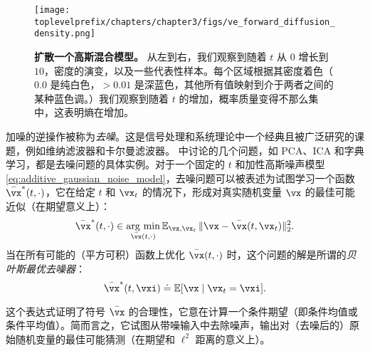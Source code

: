 \documentclass[../../book-main_zh.tex]{subfiles}
\begin{document}
\begin{figure}
	\texttt{[image: \\toplevelprefix/chapters/chapter3/figs/ve\_forward\_diffusion\_density.png]}
	\caption{\small\textbf{扩散一个高斯混合模型。} 从左到右，我们观察到随着 \(t\) 从 \(0\) 增长到 \(10\)，密度的演变，以及一些代表性样本。每个区域根据其密度着色（\(0.0\) 是纯白色，\(> 0.01\) 是深蓝色，其他所有值映射到介于两者之间的某种蓝色调。）我们观察到随着 \(t\) 的增加，概率质量变得不那么集中，这表明熵在增加。}
	\label{fig:ve_forward_density}
\end{figure}

加噪的逆操作被称为\textit{去噪}。这是信号处理和系统理论中一个经典且被广泛研究的课题，例如维纳滤波器和卡尔曼滤波器。 中讨论的几个问题，如 PCA、ICA 和字典学习，都是去噪问题的具体实例。对于一个固定的 \(t\) 和加性高斯噪声模型 \eqref{eq:additive_gaussian_noise_model}，去噪问题可以被表述为试图学习一个函数 \(\bar{\vx}^{\ast}(t, \cdot)\)，它在给定 \(t\) 和 \(\vx_{t}\) 的情况下，形成对真实随机变量 \(\vx\) 的最佳可能近似（在期望意义上）：
\begin{equation}\label{eq:denoising_loss}
	\bar{\vx}^{\ast}(t, \cdot) \in \argmin_{\bar{\vx}(t, \cdot)}\Ex_{\vx, \vx_{t}}\norm{\vx - \bar{\vx}(t, \vx_{t})}_{2}^{2}.
\end{equation}
当在所有可能的（平方可积）函数上优化 \(\bar{\vx}(t, \cdot)\) 时，这个问题的解是所谓的\textit{贝叶斯最优去噪器}：
\begin{equation}\label{eq:optimal_denoiser}
	\bar{\vx}^{\ast}(t, \vxi) \doteq \Ex[\vx \mid \vx_{t} = \vxi].
\end{equation}

这个表达式证明了符号 \(\bar{\vx}\) 的合理性，它意在计算一个条件期望（即条件均值或条件平均值）。简而言之，它试图从带噪输入中去除噪声，输出对（去噪后的）原始随机变量的最佳可能猜测（在期望和 \(\ell^{2}\) 距离的意义上）。
\end{document}
